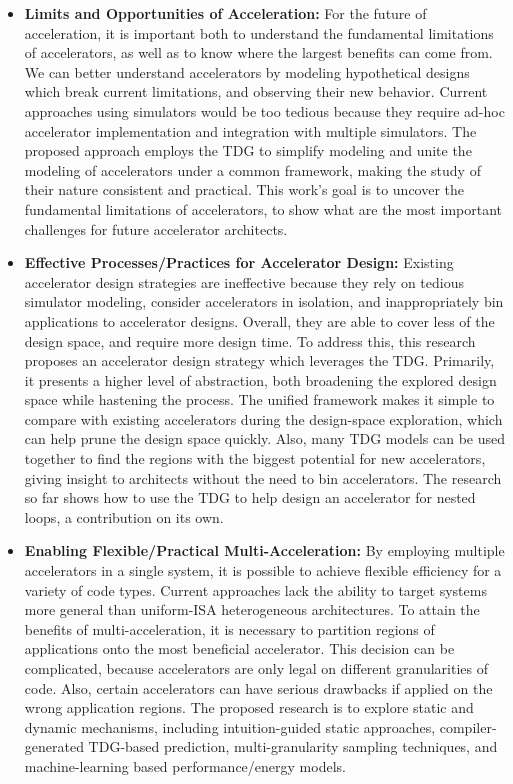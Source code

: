 \begin{itemize} \item \textbf{Limits and Opportunities of Acceleration:} For the
future of acceleration, it is important both to understand the fundamental
limitations of accelerators, as well as to know where the largest benefits can
come from.  We can better understand accelerators by modeling hypothetical
designs which break current limitations, and observing their new behavior.
Current approaches using simulators would be too tedious because they require
ad-hoc accelerator implementation and integration with multiple simulators. The
proposed approach employs the TDG to simplify modeling and unite the modeling
of accelerators under a common framework, making the study of their nature
consistent and practical.  This work's goal is to uncover the fundamental
limitations of accelerators, to show what are the most important challenges for
future accelerator architects.


\item \textbf{Effective Processes/Practices for Accelerator Design:} Existing
accelerator design strategies are ineffective because they rely on tedious
simulator modeling, consider accelerators in isolation, and inappropriately bin
applications to accelerator designs.  Overall, they are able to cover less of
the design space, and require more design time.  To address this, this research
proposes an accelerator design strategy which leverages the TDG.  Primarily, it
presents a higher level of abstraction, both broadening the explored design
space while hastening the process.  The unified framework makes it simple to
compare with existing accelerators during the design-space exploration, which
can help prune the design space quickly.  Also, many TDG models can be used
together to find the regions with the biggest potential for new accelerators,
giving insight to architects without the need to bin accelerators.  The
research so far shows how to use the TDG to help design an accelerator for
nested loops, a contribution on its own.

\item \textbf{Enabling Flexible/Practical Multi-Acceleration:} 
By employing multiple accelerators in a single system, it is possible to achieve
flexible efficiency for a variety of code types.  Current approaches lack the
ability to target systems more general than uniform-ISA heterogeneous architectures.
To attain the benefits of multi-acceleration, it is
necessary to partition regions of applications onto the most beneficial
accelerator.  This decision can be complicated, because
accelerators are only legal on different granularities of code.
Also, certain accelerators can have serious drawbacks if applied on the wrong
application regions.  The proposed research is to explore static
and dynamic mechanisms, including intuition-guided static approaches, 
compiler-generated TDG-based prediction, multi-granularity sampling techniques, 
and machine-learning based performance/energy models.  

\end{itemize}

